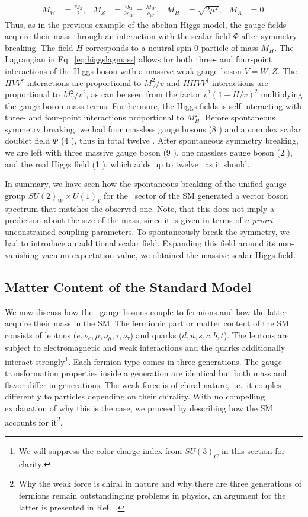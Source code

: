 \begin{align}
  M_W &= \frac{vg_2}{2}, & M_Z &=\frac{ vg_2}{2c_W}=\frac{M_W}{c_W}, &M_H
  &=\sqrt{2\mu^2}, & M_A&=0.
\end{align}
Thus, as in the previous example of the abelian Higgs model, the gauge
fields acquire their mass through an interaction with the scalar
field $\Phi$ after symmetry breaking. The field $H$ corresponds to a
neutral spin-0 particle of mass $M_H$. The Lagrangian in
Eq.~\eqref{eq:higgslagmass} allows for both three- and four-point
interactions of the Higgs boson with a massive weak gauge boson $V=W,Z$. The
$HVV^\dagger$ interactions are proportional to $M_V^2/v$ and
$HHVV^\dagger$ interactions are proportional to $M_V^2/v^2$, as can be
seen from the factor $v^2(1+H/v)^2$ multiplying the gauge boson mass
terms. Furthermore, the Higgs fields is self-interacting with three-
and four-point interactions proportional to $M_H^2$. Before
spontaneous symmetry breaking, we had four massless gauge bosons (8
\dof) and a complex scalar doublet
field $\Phi$ (4 \dof), thus in total twelve \dof. After spontaneous symmetry
breaking, we are left with three massive gauge boson (9 \dof), one
massless gauge boson (2 \dof), and the real Higgs field (1 \dof), which adds up to twelve \dof~as it should.


In summary, we have seen how the spontaneous breaking of the unified
gauge group $SU(2)_W\times U(1)_Y$ for the \ew~sector of the SM
generated a vector boson spectrum that matches the observed
one. Note, that this does not imply a
  prediction about the size of the mass, since it is given in terms of
  \textit{a priori} unconstrained coupling parameters. To spontaneously break the symmetry, we had to introduce an
additional scalar field. Expanding this field around its non-vanishing
vacuum expectation value, we obtained the massive scalar Higgs field. 

\subsection{Matter Content of the Standard Model}
\label{sec:mattercont}
We now discuss how the \ew~gauge bosons couple to fermions and how the
latter acquire their mass in the SM. The fermionic part or matter
content of the SM consists of
leptons ($e,\nu_e,\mu,\nu_\mu,\tau,\nu_\tau$) and quarks
($d,u,s,c,b,t$). The leptons are subject to electromagnetic and weak
interactions and the quarks additionally interact
strongly\footnote{We will suppress the color charge index from
  $SU(3)_C$ in this section for
clarity.}. Each fermion type comes in three generations. The
gauge transformation properties inside a generation are identical but
both mass and flavor differ in generations. The weak force is of chiral nature,
i.e.\ it couples
differently to particles depending on their chirality. With no compelling explanation of why this is the case,
we proceed by describing how the SM accounts for it\footnote{Why the weak force is
  chiral in nature and why
  there are three generations of fermions remain outstandinging problems in physics, an argument for the latter is presented in Ref.~\cite{vanderBij:2007fe}.}.


